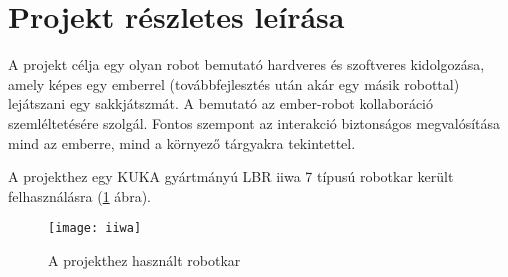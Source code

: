 \documentclass[../documentation.tex]{subfiles}
\begin{document}
\section{Projekt részletes leírása} \label{sec:projectdescription}
A projekt célja egy olyan robot bemutató hardveres és szoftveres kidolgozása, amely képes egy emberrel (továbbfejlesztés után akár egy másik robottal) lejátszani egy sakkjátszmát. A bemutató az ember-robot kollaboráció szemléltetésére szolgál. Fontos szempont az interakció biztonságos megvalósítása mind az emberre, mind a környező tárgyakra tekintettel.

A projekthez egy KUKA gyártmányú LBR iiwa 7 típusú robotkar került felhasználásra (\ref{fig:iiwa} ábra).

\begin{figure}[h]
\centering
\texttt{[image: iiwa]}
\caption{A projekthez használt robotkar\protect\footnotemark}
\label{fig:iiwa}
\end{figure}
\end{document}
